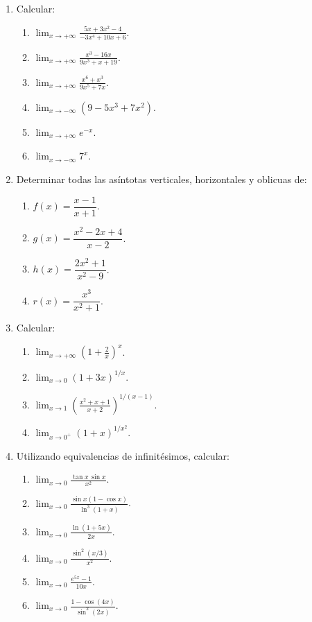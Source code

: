 \begin{enumerate}[label=\textbf{\arabic*.},leftmargin=*]
\item Calcular:
\begin{enumerate}[label=\alph*)]
\item $\displaystyle\lim_{x\to+\infty}\frac{5x+3x^2-4}{-3x^4+10x+6}$.
\item $\displaystyle\lim_{x\to+\infty}\frac{x^3-16x}{9x^3+x+19}$.
\item $\displaystyle\lim_{x\to+\infty}\frac{x^6+x^3}{9x^5+7x}$.
\item $\displaystyle\lim_{x\to-\infty}(9-5x^3+7x^2)$.
\item $\displaystyle\lim_{x\to+\infty}e^{-x}$.
\item $\displaystyle\lim_{x\to-\infty}7^x$.
\end{enumerate}

\item Determinar todas las asíntotas verticales, horizontales y oblicuas de:
\begin{enumerate}[label=\alph*)]
\item $f(x)=\dfrac{x-1}{x+1}$.
\item $g(x)=\dfrac{x^2-2x+4}{x-2}$.
\item $h(x)=\dfrac{2x^2+1}{x^2-9}$.
\item $r(x)=\dfrac{x^3}{x^2+1}$.
\end{enumerate}

\item Calcular:
\begin{enumerate}[label=\alph*)]
\item $\displaystyle\lim_{x\to+\infty}\left(1+\frac{2}{x}\right)^x$.
\item $\displaystyle\lim_{x\to0}(1+3x)^{1/x}$.
\item $\displaystyle\lim_{x\to1}\left(\frac{x^2+x+1}{x+2}\right)^{1/(x-1)}$.
\item $\displaystyle\lim_{x\to0^+}(1+x)^{1/x^2}$.
\end{enumerate}

\item Utilizando equivalencias de infinitésimos, calcular:
\begin{enumerate}[label=\alph*)]
\item $\displaystyle\lim_{x\to0}\frac{\tan x\,\sin x}{x^2}$.
\item $\displaystyle\lim_{x\to0}\frac{\sin x(1-\cos x)}{\ln^3(1+x)}$.
\item $\displaystyle\lim_{x\to0}\frac{\ln(1+5x)}{2x}$.
\item $\displaystyle\lim_{x\to0}\frac{\sin^2(x/3)}{x^2}$.
\item $\displaystyle\lim_{x\to0}\frac{e^{5x}-1}{10x}$.
\item $\displaystyle\lim_{x\to0}\frac{1-\cos(4x)}{\sin^2(2x)}$.
\end{enumerate}


\end{enumerate}
